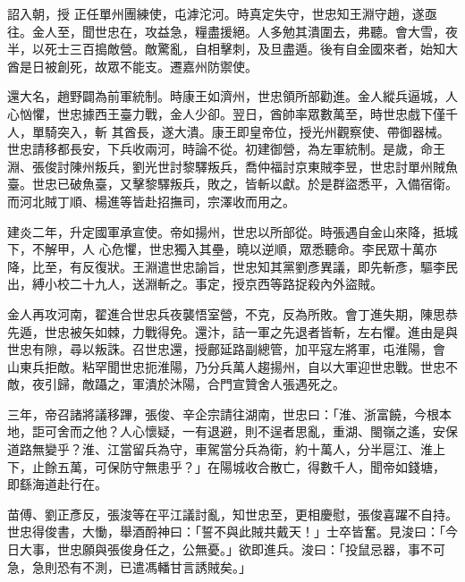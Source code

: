 \begin{pinyinscope}
 詔入朝，授
 正任單州團練使，屯滹沱河。時真定失守，世忠知王淵守趙，遂亟往。金人至，聞世忠在，攻益急，糧盡援絕。人多勉其潰圍去，弗聽。會大雪，夜半，以死士三百搗敵營。敵驚亂，自相擊刺，及旦盡遁。後有自金國來者，始知大酋是日被創死，故眾不能支。遷嘉州防禦使。



 還大名，趙野闢為前軍統制。時康王如濟州，世忠領所部勸進。金人縱兵逼城，人心忷懼，世忠據西王臺力戰，金人少卻。翌日，酋帥率眾數萬至，時世忠戲下僅千人，單騎突入，斬
 其酋長，遂大潰。康王即皇帝位，授光州觀察使、帶御器械。世忠請移都長安，下兵收兩河，時論不從。初建御營，為左軍統制。是歲，命王淵、張俊討陳州叛兵，劉光世討黎驛叛兵，喬仲福討京東賊李昱，世忠討單州賊魚臺。世忠已破魚臺，又擊黎驛叛兵，敗之，皆斬以獻。於是群盜悉平，入備宿衛。而河北賊丁順、楊進等皆赴招撫司，宗澤收而用之。



 建炎二年，升定國軍承宣使。帝如揚州，世忠以所部從。時張遇自金山來降，抵城下，不解甲，人
 心危懼，世忠獨入其壘，曉以逆順，眾悉聽命。李民眾十萬亦降，比至，有反復狀。王淵遣世忠諭旨，世忠知其黨劉彥異議，即先斬彥，驅李民出，縛小校二十九人，送淵斬之。事定，授京西等路捉殺內外盜賊。



 金人再攻河南，翟進合世忠兵夜襲悟室營，不克，反為所敗。會丁進失期，陳思恭先遁，世忠被矢如棘，力戰得免。還汴，詰一軍之先退者皆斬，左右懼。進由是與世忠有隙，尋以叛誅。召世忠還，授鄜延路副總管，加平寇左將軍，屯淮陽，會
 山東兵拒敵。粘罕聞世忠扼淮陽，乃分兵萬人趨揚州，自以大軍迎世忠戰。世忠不敵，夜引歸，敵躡之，軍潰於沐陽，合門宣贊舍人張遇死之。



 三年，帝召諸將議移蹕，張俊、辛企宗請往湖南，世忠曰：「淮、浙富饒，今根本地，詎可舍而之他？人心懷疑，一有退避，則不逞者思亂，重湖、閩嶺之遙，安保道路無變乎？淮、江當留兵為守，車駕當分兵為衛，約十萬人，分半扈江、淮上下，止餘五萬，可保防守無患乎？」在陽城收合散亡，得數千人，聞帝如錢塘，
 即繇海道赴行在。



 苗傅、劉正彥反，張浚等在平江議討亂，知世忠至，更相慶慰，張俊喜躍不自持。世忠得俊書，大慟，舉酒酹神曰：「誓不與此賊共戴天！」士卒皆奮。見浚曰：「今日大事，世忠願與張俊身任之，公無憂。」欲即進兵。浚曰：「投鼠忌器，事不可急，急則恐有不測，已遣馮轓甘言誘賊矣。」




\end{pinyinscope}
